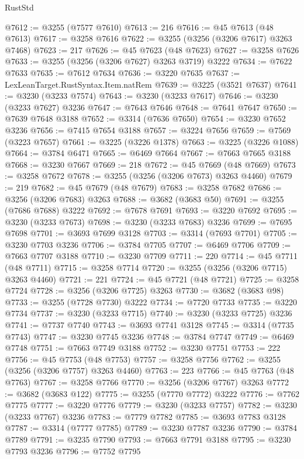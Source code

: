 \begin{lexlean}{RustStd}
\begin{coremodule}
@7612 := @3255 (@7577 @7610)
@7613 := 216
@7616 := @45 @7613 (@48 @7613)
@7617 := @3258 @7616
@7622 := @3255 (@3256 (@3206 @7617) @3263 @7468)
@7623 := 217
@7626 := @45 @7623 (@48 @7623)
@7627 := @3258 @7626
@7633 := @3255 (@3256 (@3206 @7627) @3263 @3719) @3222
@7634 := @7622 @7633
@7635 := @7612 @7634
@7636 := @3220 @7635
@7637 := LexLeanTarget.RustSyntax.Item.natRem
@7639 := @3225 (@3521 @7637)
@7641 := @3230 (@3233 @7574)
@7643 := @3230 (@3233 @7617)
@7646 := @3230 (@3233 @7627) @3236
@7647 := @7643 @7646
@7648 := @7641 @7647
@7650 := @7639 @7648 @3188
@7652 := @3314 (@7636 @7650)
@7654 := @3230 @7652 @3236
@7656 := @7415 @7654 @3188
@7657 := @3224 @7656
@7659 := @7569 (@3223 @7657)
@7661 := @3225 (@3226 @1378)
@7663 := @3225 (@3226 @1088)
@7664 := @3784 @6471
@7665 := @6469 @7664
@7667 := @7663 @7665 @3188
@7668 := @3230 @7667
@7669 := 218
@7672 := @45 @7669 (@48 @7669)
@7673 := @3258 @7672
@7678 := @3255 (@3256 (@3206 @7673) @3263 @4460)
@7679 := 219
@7682 := @45 @7679 (@48 @7679)
@7683 := @3258 @7682
@7686 := @3256 (@3206 @7683) @3263
@7688 := @3682 (@3683 @50)
@7691 := @3255 (@7686 @7688) @3222
@7692 := @7678 @7691
@7693 := @3220 @7692
@7695 := @3230 (@3233 @7673)
@7698 := @3230 (@3233 @7683) @3236
@7699 := @7695 @7698
@7701 := @3693 @7699 @3128
@7703 := @3314 (@7693 @7701)
@7705 := @3230 @7703 @3236
@7706 := @3784 @7705
@7707 := @6469 @7706
@7709 := @7663 @7707 @3188
@7710 := @3230 @7709
@7711 := 220
@7714 := @45 @7711 (@48 @7711)
@7715 := @3258 @7714
@7720 := @3255 (@3256 (@3206 @7715) @3263 @4460)
@7721 := 221
@7724 := @45 @7721 (@48 @7721)
@7725 := @3258 @7724
@7728 := @3256 (@3206 @7725) @3263
@7730 := @3682 (@3683 @98)
@7733 := @3255 (@7728 @7730) @3222
@7734 := @7720 @7733
@7735 := @3220 @7734
@7737 := @3230 (@3233 @7715)
@7740 := @3230 (@3233 @7725) @3236
@7741 := @7737 @7740
@7743 := @3693 @7741 @3128
@7745 := @3314 (@7735 @7743)
@7747 := @3230 @7745 @3236
@7748 := @3784 @7747
@7749 := @6469 @7748
@7751 := @7663 @7749 @3188
@7752 := @3230 @7751
@7753 := 222
@7756 := @45 @7753 (@48 @7753)
@7757 := @3258 @7756
@7762 := @3255 (@3256 (@3206 @7757) @3263 @4460)
@7763 := 223
@7766 := @45 @7763 (@48 @7763)
@7767 := @3258 @7766
@7770 := @3256 (@3206 @7767) @3263
@7772 := @3682 (@3683 @122)
@7775 := @3255 (@7770 @7772) @3222
@7776 := @7762 @7775
@7777 := @3220 @7776
@7779 := @3230 (@3233 @7757)
@7782 := @3230 (@3233 @7767) @3236
@7783 := @7779 @7782
@7785 := @3693 @7783 @3128
@7787 := @3314 (@7777 @7785)
@7789 := @3230 @7787 @3236
@7790 := @3784 @7789
@7791 := @3235 @7790
@7793 := @7663 @7791 @3188
@7795 := @3230 @7793 @3236
@7796 := @7752 @7795

\end{coremodule}
\end{lexlean}
